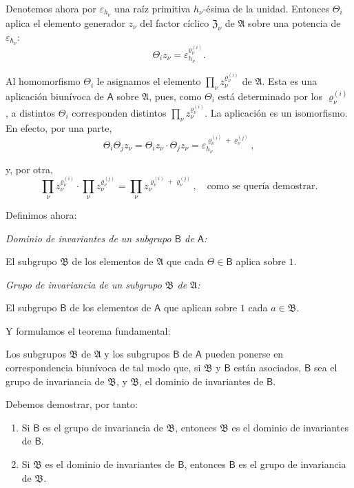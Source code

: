 Denotemos ahora por \(\varepsilon_{h_\nu}\) una raíz primitiva \(h_\nu\)-ésima de la unidad. Entonces \(\Theta_i\) aplica el elemento generador \(z_\nu\) del factor cíclico \(\mathfrak Z_\nu\) de \(\mathfrak A\) sobre una potencia de \(\varepsilon_{h_\nu}\):
\[
\Theta_i z_\nu=\varepsilon_{h_\nu}^{\varrho_\nu^{(i)}}.
\]

Al homomorfismo \(\Theta_i\) le asignamos el elemento \(\prod_\nu z_\nu^{\varrho_\nu^{(i)}}\) de \(\mathfrak A\). Esta es una aplicación biunívoca de \(\mathsf A\) sobre \(\mathfrak A\), pues, como \(\Theta_i\) está determinado por los \(\varrho_\nu^{(i)}\), a distintos \(\Theta_i\) corresponden distintos \(\prod_\nu z_\nu^{\varrho_\nu^{(i)}}\). La aplicación es un isomorfismo. En efecto, por una parte,
\[
\Theta_i\Theta_j z_\nu=\Theta_i z_\nu\cdot \Theta_j z_\nu
=\varepsilon_{h_\nu}^{\varrho_\nu^{(i)}+\varrho_\nu^{(j)}},
\]

y, por otra,
\[
\prod_\nu z_\nu^{\varrho_\nu^{(i)}}\cdot
\prod_\nu z_\nu^{\varrho_\nu^{(j)}}=
\prod_\nu z_\nu^{\varrho_\nu^{(i)}+\varrho_\nu^{(j)}},
\quad\text{como se quería demostrar.}
\]

Definimos ahora:

\emph{Dominio de invariantes de un subgrupo \(\mathsf B\) de \(\mathsf A\):}

El subgrupo \(\mathfrak B\) de los elementos de \(\mathfrak A\) que cada \(\Theta\in\mathsf B\) aplica sobre \(1\).

\emph{Grupo de invariancia de un subgrupo \(\mathfrak B\) de \(\mathfrak A\):}

El subgrupo \(\mathsf B\) de los elementos de \(\mathsf A\) que aplican sobre \(1\) cada \(a\in\mathfrak B\).

Y formulamos el teorema fundamental:

Los subgrupos \(\mathfrak B\) de \(\mathfrak A\) y los subgrupos \(\mathsf B\) de \(\mathsf A\) pueden ponerse en correspondencia biunívoca de tal modo que, si \(\mathfrak B\) y \(\mathsf B\) están asociados, \(\mathsf B\) sea el grupo de invariancia de \(\mathfrak B\), y \(\mathfrak B\), el dominio de invariantes de \(\mathsf B\).

Debemos demostrar, por tanto:

\begin{enumerate}
\item Si \(\mathsf B\) es el grupo de invariancia de \(\mathfrak B\), entonces \(\mathfrak B\) es el dominio de invariantes de \(\mathsf B\).
\item Si \(\mathfrak B\) es el dominio de invariantes de \(\mathsf B\), entonces \(\mathsf B\) es el grupo de invariancia de \(\mathfrak B\).
\end{enumerate}

